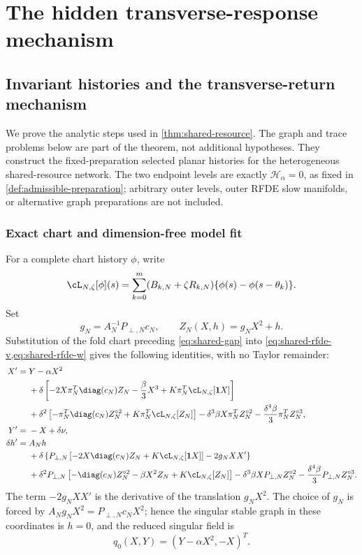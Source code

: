 \section{The hidden transverse-response mechanism}\label{sec:network-mechanism}

\subsection{Invariant histories and the transverse-return mechanism}
\label{subsec:shared-proof}

We prove the analytic steps used in \cref{thm:shared-resource}.  The graph
and trace problems below are part of the theorem, not additional hypotheses.
They construct the fixed-preparation selected planar histories for the heterogeneous
shared-resource network.  The two endpoint
levels are exactly \(\mathscr H_\alpha=0\), as fixed in
\cref{def:admissible-preparation}; arbitrary outer levels, outer RFDE slow
manifolds, or alternative graph preparations are not included.

\subsubsection{Exact chart and dimension-free model fit}

For a complete chart history \(\phi\), write
\[
 \cL_{N,\zeta}[\phi](s)
 =\sum_{k=0}^m(B_{k,N}+\zeta R_{k,N})
       \{\phi(s)-\phi(s-\theta_k)\}.
\]
Set
\[
 g_N=A_N^{-1}P_{\perp,N}c_N,
 \qquad Z_N(X,h)=g_NX^2+h.
\]
Substitution of the fold chart preceding \cref{eq:shared-gap} into
\cref{eq:shared-rfde-v,eq:shared-rfde-w} gives the following identities,
with no Taylor remainder:
\begin{align}
 X'={}&Y-\alpha X^2\notag\\
 &+\delta\left[-2X\pi_N^T\diag(c_N)Z_N
          -\frac\beta3X^3
          +K\pi_N^T\cL_{N,\zeta}[\mathbf1X]\right]\notag\\
 &+\delta^2\left[-\pi_N^T\diag(c_N)Z_N^{\circ2}
          +K\pi_N^T\cL_{N,\zeta}[Z_N]\right]
 -\delta^3\beta X\pi_N^TZ_N^{\circ2}
 -\frac{\delta^4\beta}{3}\pi_N^TZ_N^{\circ3},
                                                               \label{eq:shared-exact-X}\\
 Y'={}&-X+\delta\nu,                                  \label{eq:shared-exact-Y}\\
 \delta h'={}&A_Nh\notag\\
 &+\delta\left\{P_{\perp,N}\left[-2X\diag(c_N)Z_N
               +K\cL_{N,\zeta}[\mathbf1X]\right]
               -2g_NX X'\right\}\notag\\
 &+\delta^2P_{\perp,N}\left[-\diag(c_N)Z_N^{\circ2}
             -\beta X^2Z_N+K\cL_{N,\zeta}[Z_N]\right]
 -\delta^3\beta X P_{\perp,N}Z_N^{\circ2}
 -\frac{\delta^4\beta}{3}P_{\perp,N}Z_N^{\circ3}.
                                                               \label{eq:shared-exact-h}
\end{align}
The term \(-2g_NXX'\) is the derivative of the translation \(g_NX^2\).
The choice of \(g_N\) is forced by
\(A_Ng_NX^2=P_{\perp,N}c_NX^2\); hence the singular stable graph in these
coordinates is \(h=0\), and the reduced singular field is
\[
 q_0(X,Y)=(Y-\alpha X^2,-X)^T.
\]

